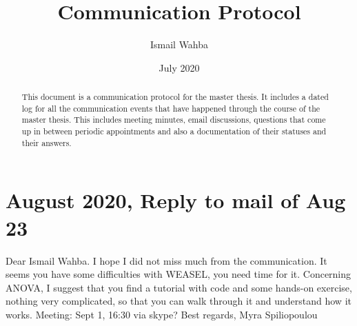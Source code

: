 \documentclass{article}
\title{Communication Protocol}
\author{Ismail Wahba }
\date{July 2020}
\begin{document}
\maketitle

\begin{abstract}
	This document is a communication protocol for the master thesis. It includes a dated log for all the communication events that have happened through the course of the master thesis. This includes meeting minutes, email discussions, questions that come up in between periodic appointments and also a documentation of their statuses and their answers.
\end{abstract}

\section*{\texorpdfstring{}. August 2020, Reply to mail of Aug 23}
Dear Ismail Wahba.\newline
I hope I did not miss much from the communication. It seems you have some difficulties with WEASEL, you need time for it.\newline
Concerning ANOVA, I suggest that you find a tutorial with code and some hands-on exercise, nothing very complicated, so that you can walk through it and understand how it works.\newline
Meeting: Sept 1, 16:30 via skype?\newline
Best regards,
Myra Spiliopoulou
\end{document}
